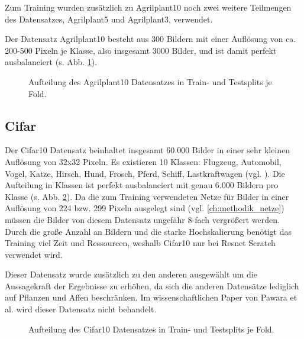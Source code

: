 Zum Training wurden zusätzlich zu Agrilplant10 noch zwei weitere Teilmengen des Datensatzes, Agrilplant5 und Agrilplant3, verwendet.

Der Datensatz Agrilplant10 besteht aus 300 Bildern mit einer Auflösung von ca. 200-500 Pixeln je Klasse, also insgesamt 3000 Bilder, und ist damit perfekt ausbalanciert (s. Abb. \ref{fig:Agrilplant10Zusammensetzung}).\\


\begin{figure}[H]
\begin{adjustbox}{width=1.4\textwidth, center}

\end{adjustbox}
\caption{Aufteilung des Agrilplant10 Datensatzes \cite{pawaraWebsiteDatensaetze} in Train- und Testsplits je Fold.}
\label{fig:Agrilplant10Zusammensetzung}
\end{figure}


\subsection{Cifar}
Der Cifar10 Datensatz beinhaltet insgesamt 60.000 Bilder in einer sehr kleinen Auflösung von 32x32 Pixeln. Es existieren 10 Klassen: Flugzeug, Automobil, Vogel, Katze, Hirsch, Hund, Frosch, Pferd, Schiff, Lastkraftwagen (vgl. \cite{cifar10}).
Die Aufteilung in Klassen ist perfekt ausbalanciert mit genau 6.000 Bildern pro Klasse (s. Abb. \ref{fig:Cifar10Zusammensetzung}).
Da die zum Training verwendeten Netze für Bilder in einer Auflösung von 224 bzw. 299 Pixeln ausgelegt sind (vgl. \ref{ch:methodik_netze}) müssen die Bilder von diesem Datensatz ungefähr 8-fach vergrößert werden.\\

Durch die große Anzahl an Bildern und die starke Hochskalierung benötigt das Training viel Zeit und Ressourcen, weshalb Cifar10 nur bei Resnet Scratch verwendet wird.

Dieser Datensatz wurde zusätzlich zu den anderen ausgewählt um die Aussagekraft der Ergebnisse zu erhöhen, da sich die anderen Datensätze lediglich auf Pflanzen und Affen beschränken. Im wissenschaftlichen Paper von Pawara et al. \cite{pawaraPaper} wird dieser Datensatz nicht behandelt.

\begin{figure}[H]
\begin{adjustbox}{width=1.4\textwidth, center}

\end{adjustbox}
\caption{Aufteilung des Cifar10 Datensatzes \cite{cifar10} in Train- und Testsplits je Fold.}
\label{fig:Cifar10Zusammensetzung}
\end{figure}


